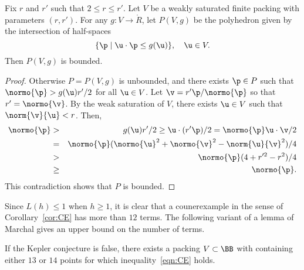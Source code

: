\begin{lemma}[]\label{lemma:poly-bounded} 
Fix $r$ and $r'$ such that $2\le r\le r'$.
Let $ V$ be a weakly saturated finite packing with parameters $(r,r')$.
For any $g: V\to\ring{R}$, let $P( V,g)$ be the
polyhedron given by the intersection of half-spaces
\begin{displaymath} 
\{\p \mid  \u\cdot \p \le g( \u)\},\quad \u\in V.
\end{displaymath}
Then $P( V,g)$ is bounded.
\end{lemma}
%

\begin{proof} Otherwise $P=P( V,g)$ is unbounded, and there exists
$\p\in P$ such that $\normo{\p} > g( \u) r'/2$ for all $ \u\in V$.
Let $\v = r' \p/\normo{\p}$ so that $r'=\normo{\v}$.  By the weak
saturation of $ V$, there exists $ \u\in V$ such that $\norm{\v}{
\u}<r$.  Then,
\begin{eqnarray*} 
\normo{\p} &>& g( \u) r'/2 \ge  \u\cdot (r' \p)/2 = \normo{\p}  \u\cdot \v /2\\
&=& \normo{\p} (\normo{ \u}^2 + \normo{\v}^2 - \norm{ \u}{\v}^2)/4\\
&>& \normo{\p}(4+r'^2-r^2)/4\\
&\ge& \normo{\p}.
\end{eqnarray*}
This contradiction shows that $P$ is bounded.
\end{proof}




Since $L(h)\le 1$ when $h\ge1$, it is clear that a counerexample in
the sense of Corollary~\ref{cor:CE} has more than $12$  terms.
The following variant of a lemma of Marchal gives an upper bound on
the number of  terms.


\begin{lemma}[]\label{lemma:13-14}  %
If the Kepler conjecture is false, there exists a packing $ V\subset\BB$ with 
containing either $13$ or $14$  points for which
inequality~\ref{eqn:CE} holds.
\end{lemma}


